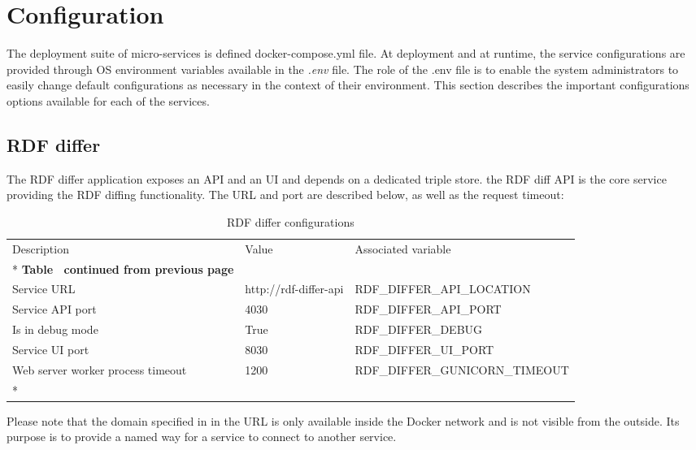 \section{Configuration}
\label{sec:configuration}
    
    The deployment suite of micro-services is defined docker-compose.yml file. At deployment and at runtime, the service configurations are provided through OS environment variables available in the \textit{.env} file. The role of the .env file is to enable the system administrators to easily change default configurations as necessary in the context of their environment. 
    This section describes the important configurations options available for each of the services.
	
	\subsection{RDF differ}
	
	The RDF differ application exposes an API and an UI and depends on a dedicated triple store. the RDF diff API is the core service providing the RDF diffing functionality. The URL and port are described below, as well as the request timeout:
	
	\begin{longtable}[c]{@{}p{3.5cm}p{3.5cm}l@{}}
		\toprule
		Description & Value & Associated variable \\* \midrule
		\endfirsthead
		\multicolumn{3}{c}%
		{{\bfseries Table \thetable\ continued from previous page}} \\
		\endhead
		\bottomrule
		\endfoot
		\endlastfoot
		Service URL & http://rdf-differ-api & RDF\_DIFFER\_API\_LOCATION \\
		Service API port & 4030 & RDF\_DIFFER\_API\_PORT \\
		Is in debug mode & True & RDF\_DIFFER\_DEBUG \\
		Service UI port & 8030 & RDF\_DIFFER\_UI\_PORT \\
		Web server worker process timeout & 1200 & RDF\_DIFFER\_GUNICORN\_TIMEOUT \\* \bottomrule
		\caption{RDF differ configurations}
		\label{tab:my-table1}\\
	\end{longtable}

	Please note that the domain specified in in the URL is only available inside the Docker network and is not visible from the outside. Its purpose is to provide a named way for a service to connect to another service. 
	
